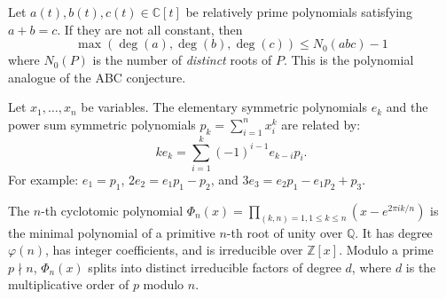 \begin{theorem}
Let $a(t), b(t), c(t) \in \mathbb{C}[t]$ be relatively prime polynomials satisfying $a + b = c$. If they are not all constant, then
\[ \max(\deg(a), \deg(b), \deg(c)) \le N_0(abc) - 1 \]
where $N_0(P)$ is the number of \textit{distinct} roots of $P$. This is the polynomial analogue of the ABC conjecture.
\end{theorem}

\begin{theorem}
Let $x_1, \dots, x_n$ be variables. The elementary symmetric polynomials $e_k$ and the power sum symmetric polynomials $p_k = \sum_{i=1}^n x_i^k$ are related by:
\[ k e_k = \sum_{i=1}^k (-1)^{i-1} e_{k-i} p_i. \]
For example: $e_1 = p_1$, $2e_2 = e_1 p_1 - p_2$, and $3e_3 = e_2 p_1 - e_1 p_2 + p_3$.
\end{theorem}

\begin{definition}
The $n$-th cyclotomic polynomial $\Phi_n(x) = \prod_{(k,n)=1, 1 \le k \le n} (x - e^{2\pi i k / n})$ is the minimal polynomial of a primitive $n$-th root of unity over $\mathbb{Q}$. It has degree $\varphi(n)$, has integer coefficients, and is irreducible over $\mathbb{Z}[x]$. Modulo a prime $p \nmid n$, $\Phi_n(x)$ splits into distinct irreducible factors of degree $d$, where $d$ is the multiplicative order of $p$ modulo $n$.
\end{definition}
